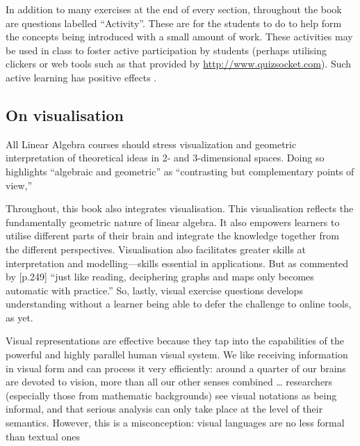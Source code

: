 In addition to many exercises at the end of every section, throughout the book are questions labelled ``Activity''.
These are for the students to do to help form the concepts being introduced with a small amount of work.
These activities may be used in class to foster active participation by students (perhaps utilising clickers or web tools such as that provided by \url{http://www.quizsocket.com}).
Such active learning has positive effects \cite[]{ED498555}.




\subsection*{On visualisation}

\begin{quoted}{\cite{CUPMguide2015}}%
All Linear Algebra courses should stress visualization and geometric interpretation of theoretical ideas in 2- and 3-dimensional spaces. Doing so highlights ``algebraic and geometric'' as ``contrasting but complementary points of view,''
\end{quoted}


Throughout, this book also integrates visualisation.
This visualisation reflects the fundamentally geometric nature of linear algebra.  
It also empowers learners to utilise different parts of their brain and integrate the knowledge together from the different perspectives.
Visualisation also facilitates greater skills at interpretation and modelling---skills essential in applications.
But as commented by \cite{Fara2009} [p.249] ``just like reading, deciphering graphs and maps only becomes automatic with practice.''
So, lastly, visual exercise questions develops understanding without a learner being able to defer the challenge to online tools, as yet.  

\begin{quoted}{\cite{Moody2009}}
Visual representations are effective because they tap into the capabilities of the powerful and highly parallel human visual system.
We like receiving information in visual form and can process it very efficiently: around a quarter of our brains are devoted to vision, more than all our other senses combined  \ldots
researchers (especially those from mathematic backgrounds) see visual notations as being informal, and that serious analysis can only take place at the level of their semantics. 
However, this is a misconception: visual languages are no less formal than textual ones
\end{quoted}









